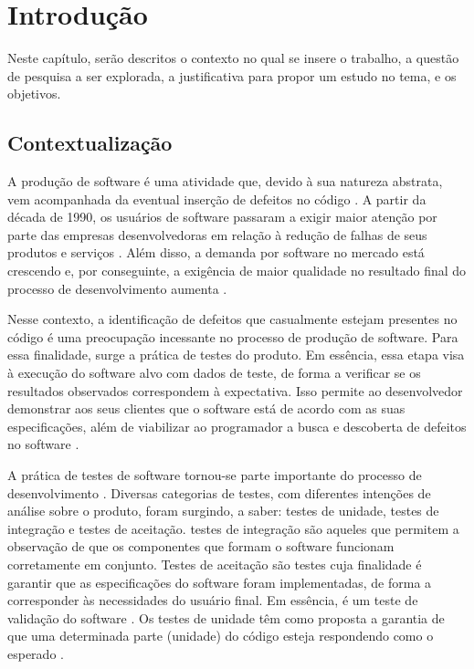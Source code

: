 \chapter[Introdução]{Introdução}

Neste capítulo, serão descritos o contexto no qual se insere o trabalho, a
questão de pesquisa a ser explorada, a justificativa para propor um estudo no
tema, e os objetivos.

\section{Contextualização}
\indent A produção de software é uma atividade que, devido à sua natureza
abstrata, vem acompanhada da eventual inserção de defeitos no código
\cite{trodo2009}. A partir da década de 1990, os usuários de software
passaram a exigir maior atenção por parte das empresas desenvolvedoras em 
relação à redução de falhas de seus produtos e serviços
\cite{sommerville2007}. Além disso, a demanda por software no mercado está
crescendo \cite{philipson2004} e, por conseguinte, a exigência de maior
qualidade no resultado final do processo de desenvolvimento aumenta
\cite{barbosaEtAl2009}.
\par
\indent Nesse contexto, a identificação de defeitos que casualmente estejam
presentes no código é uma preocupação incessante no processo de produção de
software. Para essa finalidade, surge a prática de testes do produto. Em
essência, essa etapa visa à execução do software alvo com dados de teste, de
forma a verificar se os resultados observados correspondem à expectativa.
Isso permite ao desenvolvedor demonstrar aos seus clientes que o software
está de acordo com as suas especificações, além de viabilizar ao
programador a busca e descoberta de defeitos no software
\cite{sommerville2007}.
\par
\indent A prática de testes de software tornou-se parte importante do
processo de desenvolvimento \cite{barbosaEtAl2009}. Diversas categorias de
testes, com diferentes intenções de análise sobre o produto, foram surgindo,
a saber: testes de unidade, testes de integração e testes de aceitação.
testes de integração são aqueles que permitem a observação de que os
componentes que formam o software funcionam corretamente em conjunto. Testes
de aceitação são testes cuja finalidade é garantir que as especificações do software foram implementadas, de forma a corresponder às necessidades do usuário final. Em essência, é um teste de validação do software \cite{sommerville2007}. Os testes de unidade têm como proposta a garantia  de que uma determinada parte (unidade) do código esteja respondendo como o esperado \cite{sommerville2007}. 
